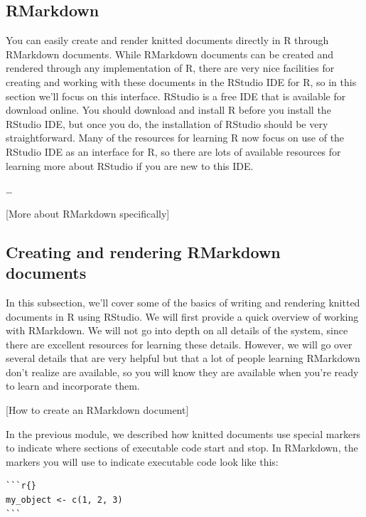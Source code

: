 \documentclass[]{tufte-book}
\begin{document}
\hypertarget{rmarkdown}{%
\subsection{RMarkdown}\label{rmarkdown}}

You can easily create and render knitted documents directly in R through RMarkdown
documents. While RMarkdown documents can be created and rendered through any
implementation of R, there are very nice facilities for creating and working with
these documents in the RStudio IDE for R, so in this section we'll focus on
this interface. RStudio is a free IDE that is available for download online.
You should download and install R before you install the RStudio IDE, but once you
do, the installation of RStudio should be very straightforward. Many of the
resources for learning R now focus on use of the RStudio IDE as an interface for
R, so there are lots of available resources for learning more about RStudio if you
are new to this IDE.

\ldots{}

{[}More about RMarkdown specifically{]}

\hypertarget{creating-and-rendering-rmarkdown-documents}{%
\subsection{Creating and rendering RMarkdown documents}\label{creating-and-rendering-rmarkdown-documents}}

In this subsection, we'll cover some of the basics of writing and rendering
knitted documents in R using RStudio. We will first provide a quick overview
of working with RMarkdown. We will not go into depth on all details of the
system, since there are excellent resources for learning these details. However,
we will go over several details that are very helpful but that a lot of people
learning RMarkdown don't realize are available, so you will know they are
available when you're ready to learn and incorporate them.

{[}How to create an RMarkdown document{]}

In the previous module, we described how knitted documents use special markers
to indicate where sections of executable code start and stop. In RMarkdown,
the markers you will use to indicate executable code look like this:

\begin{verbatim}
```r{}
my_object <- c(1, 2, 3)
```
\end{verbatim}
\end{document}
